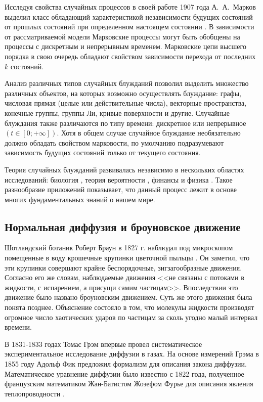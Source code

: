 Исследуя свойства случайных процессов в своей работе 1907 года А.~А.~Марков выделил класс обладающий характеристикой независимости будущих состояний от прошлых состояний при определенном настоящем состоянии \cite{shiryaev_2021}. В зависимости от рассматриваемой модели Марковские процессы могут быть обобщены на процессы с дискретным и непрерывным временем. Марковские цепи высшего порядка в свою очередь обладают свойством зависимости перехода от последних $k$ состояний.

Анализ различных типов случайных блужданий позволил выделить множество различных объектов, на которых возможно осуществлять блуждание: графы, числовая прямая (целые или действительные числа), векторные пространства, конечные группы, группы Ли, кривые поверхности и другие. Случайные блуждания также различаются по типу времени: дискретное или непрерывное $(t \in [0; +\infty])$. Хотя в общем случае случайное блуждание необязательно должно обладать свойством марковости, по умолчанию подразумевают зависимость будущих состояний только от текущего состояния.

Теория случайных блужданий развивалась независимо в нескольких областях исследований: биология \cite{chowdhury_100_2005}, теория вероятности \cite{strecker_alexandr_2011}, финансы \cite{bachelier_theorie_1900} и физика \cite{pearson_problem_1905,rayleigh_problem_1905}. Такое разнообразие приложений показывает, что данный процесс лежит в основе многих фундаментальных знаний о нашем мире.

\subsection{Нормальная диффузия и броуновское движение}\label{subsec:ch1/sec2/sub1}

Шотландский ботаник Роберт Браун в 1827 г. наблюдал под микроскопом помещенные в воду крошечные крупинки цветочной пыльцы \cite{brown_brief_2015}. Он заметил, что эти крупинки совершают крайне беспорядочные, зигзагообразные движения. Согласно его же словам, наблюдаемые движения <<не связаны с потоками в жидкости, с испарением, а присущи самим частицам>>. Впоследствии это движение было названо броуновским движением. Суть же этого движения была понята позднее. Объяснение состояло в том, что молекулы жидкости производят огромное число хаотических ударов по частицам за сколь угодно малый интервал времени.

В 1831-1833 годах Томас Грэм впервые провел систематическое экспериментальное исследование диффузии в газах. На основе измерений Грэма в 1855 году Адольф Фик предложил формализм для описания закона диффузии. Математическое уравнение диффузии было известно с 1822 года, полученное французским математиком Жан-Батистом Жозефом Фурье для описания явления теплопроводности \cite{fourier_theorie_1822}. 

